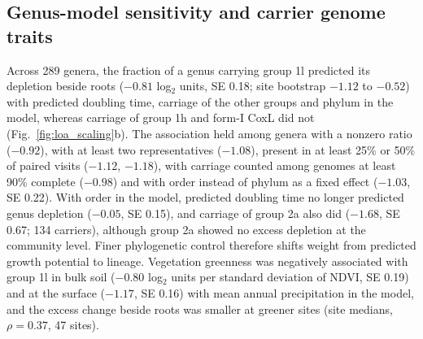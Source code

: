 \subsection*{Genus-model sensitivity and carrier genome traits}
Across 289 genera, the fraction of a genus carrying group 1l predicted its depletion beside roots ($-0.81$
log$_2$ units, SE 0.18; site bootstrap $-1.12$ to $-0.52$) with predicted doubling time, carriage of the
other groups and phylum in the model, whereas carriage of group 1h and form-I CoxL did not
(Fig.~\ref{fig:loa_scaling}b). The association held among genera with a nonzero ratio ($-0.92$), with at least
two representatives ($-1.08$), present in at least 25\% or 50\% of paired visits ($-1.12$, $-1.18$), with
carriage counted among genomes at least 90\% complete ($-0.98$) and with order instead of phylum as a fixed
effect ($-1.03$, SE 0.22). With order in the model, predicted doubling time no longer predicted genus
depletion ($-0.05$, SE 0.15), and carriage of group 2a also did ($-1.68$, SE 0.67; 134 carriers), although
group 2a showed no excess depletion at the community level. Finer phylogenetic control therefore shifts
weight from predicted growth potential to lineage. Vegetation greenness was negatively associated
with group 1l in bulk soil ($-0.80$ log$_2$ units per standard deviation of NDVI, SE 0.19) and at the surface
($-1.17$, SE 0.16) with mean annual precipitation in the model, and the excess change beside roots was
smaller at greener sites (site medians, $\rho=0.37$, 47 sites).

